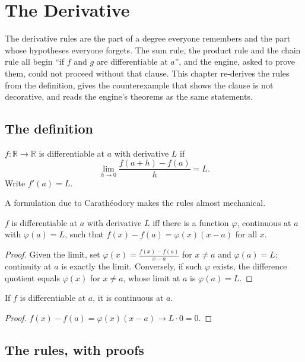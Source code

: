 \chapter{The Derivative}\label{ch:dderiv}

The derivative rules are the part of a degree everyone remembers and the part whose hypotheses
everyone forgets. The sum rule, the product rule and the chain rule all begin ``if $f$ and $g$
are differentiable at $a$'', and the engine, asked to prove them, could not proceed without
that clause. This chapter re-derives the rules from the definition, gives the counterexample
that shows the clause is not decorative, and reads the engine's theorems as the same statements.

\section{The definition}

\begin{definition}
  $f : \mathbb{R} \to \mathbb{R}$ is differentiable at $a$ with derivative $L$ if
  \[
    \lim_{h \to 0} \frac{f(a + h) - f(a)}{h} = L .
  \]
  Write $f'(a) = L$.
\end{definition}

A formulation due to Carathéodory makes the rules almost mechanical.

\begin{theorem}[Carathéodory]
  $f$ is differentiable at $a$ with derivative $L$ iff there is a function $\varphi$, continuous
  at $a$ with $\varphi(a) = L$, such that $f(x) - f(a) = \varphi(x)(x - a)$ for all $x$.
\end{theorem}
\begin{proof}
  Given the limit, set $\varphi(x) = \frac{f(x) - f(a)}{x - a}$ for $x \neq a$ and $\varphi(a) = L$;
  continuity at $a$ is exactly the limit. Conversely, if such $\varphi$ exists, the difference
  quotient equals $\varphi(x)$ for $x \neq a$, whose limit at $a$ is $\varphi(a) = L$.
\end{proof}

\begin{theorem}
  If $f$ is differentiable at $a$, it is continuous at $a$.
\end{theorem}
\begin{proof}
  $f(x) - f(a) = \varphi(x)(x - a) \to L \cdot 0 = 0$.
\end{proof}

\section{The rules, with proofs}

